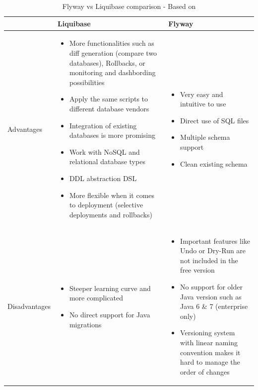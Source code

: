 \begin{table}[H]
	\centering
		    \begin{tabular}{|l|p{}|p{}|}
		    \hline
			 & Liquibase & Flyway\\ \hline
			 \begin{turn}{-90}Advantages\end{turn} &
			\begin{itemize}
				\item More functionalities such as diff generation (compare two databases), Rollbacks, or monitoring and dashbording possibilities
				\item Apply the same scripts to different database vendors
				\item Integration of existing databases is more promising
				\item Work with NoSQL and relational database types
				\item DDL abstraction DSL
				\item More flexible when it comes to deployment (selective deployments and rollbacks)
			\end{itemize} & \begin{itemize}
				\item Very easy and intuitive to use
				\item Direct use of SQL files
				\item Multiple schema support
				\item Clean existing schema
			\end{itemize}\\ \hline
		
	 \begin{turn}{-90}Disadvantages\end{turn} &
		\begin{itemize}
			\item Steeper learning curve and more complicated 
			\item No direct support for Java migrations
		\end{itemize} & \begin{itemize}
			\item Important features like Undo or Dry-Run are not included in the free version 
			\item No support for older Java version such as Java 6 \& 7 (enterprise only)
			\item Versioning system with linear naming convention makes it hard to manage the order of changes
		\end{itemize}\\ \hline
		\end{tabular}
	\caption{Flyway vs Liquibase comparison - Based on \cite{Parsick2018, Kaps2016}}
	\label{tab:flyway_liquivase_conparison}
\end{table}

